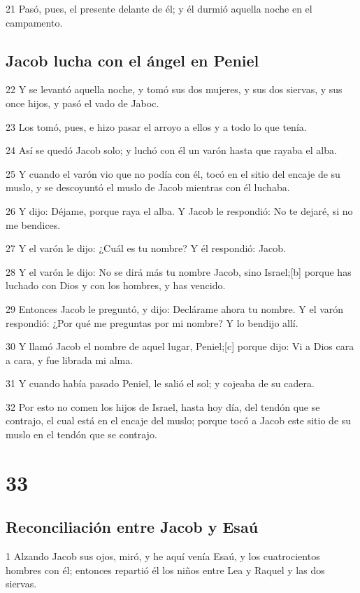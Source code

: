 21 Pasó, pues, el presente delante de él; y él durmió aquella noche en el campamento.

\section{Jacob lucha con el ángel en Peniel}

22 Y se levantó aquella noche, y tomó sus dos mujeres, y sus dos siervas, y sus once hijos, y pasó el vado de Jaboc.

23 Los tomó, pues, e hizo pasar el arroyo a ellos y a todo lo que tenía.

24 Así se quedó Jacob solo; y luchó con él un varón hasta que rayaba el alba.

25 Y cuando el varón vio que no podía con él, tocó en el sitio del encaje de su muslo, y se descoyuntó el muslo de Jacob mientras con él luchaba.

26 Y dijo: Déjame, porque raya el alba. Y Jacob le respondió: No te dejaré, si no me bendices.

27 Y el varón le dijo: ¿Cuál es tu nombre? Y él respondió: Jacob.

28 Y el varón le dijo: No se dirá más tu nombre Jacob, sino Israel;[b] porque has luchado con Dios y con los hombres, y has vencido.

29 Entonces Jacob le preguntó, y dijo: Declárame ahora tu nombre. Y el varón respondió: ¿Por qué me preguntas por mi nombre? Y lo bendijo allí.

30 Y llamó Jacob el nombre de aquel lugar, Peniel;[c] porque dijo: Vi a Dios cara a cara, y fue librada mi alma.

31 Y cuando había pasado Peniel, le salió el sol; y cojeaba de su cadera.

32 Por esto no comen los hijos de Israel, hasta hoy día, del tendón que se contrajo, el cual está en el encaje del muslo; porque tocó a Jacob este sitio de su muslo en el tendón que se contrajo.

\chapter{33}

\section{Reconciliación entre Jacob y Esaú}

1 Alzando Jacob sus ojos, miró, y he aquí venía Esaú, y los cuatrocientos hombres con él; entonces repartió él los niños entre Lea y Raquel y las dos siervas.


